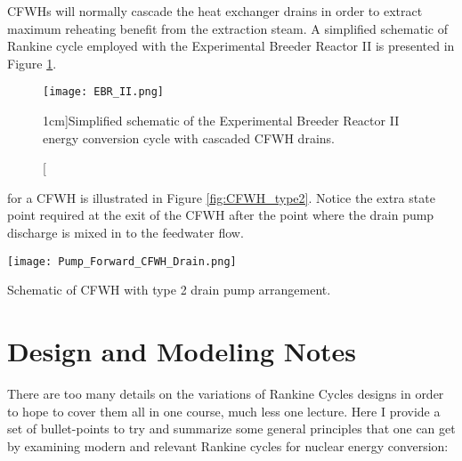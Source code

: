  CFWHs will normally cascade the heat exchanger drains in order to extract maximum reheating benefit from the extraction steam.  A simplified schematic of Rankine cycle employed with the Experimental Breeder Reactor II is presented in Figure \ref{fig:EBRII}.\cite{koch2008experimental}
\begin{figure}
\texttt{[image: EBR\_II.png]}
\caption[][1cm]{Simplified schematic of the Experimental Breeder Reactor II energy conversion cycle with cascaded CFWH drains.}
\label{fig:EBRII}
\end{figure}


 for a CFWH is illustrated in Figure \ref{fig:CFWH_type2}.  Notice the extra state point required at the exit of the CFWH after the point where the drain pump discharge is mixed in to the feedwater flow.  
\begin{marginfigure}
\texttt{[image: Pump\_Forward\_CFWH\_Drain.png]}
\caption{Schematic of CFWH with type 2 drain pump arrangement.}
\label{fig:CFWH_type2}
\end{marginfigure}




\section{Design and Modeling Notes}
There are too many details on the variations of Rankine Cycles designs in order to hope to cover them all in one course, much less one lecture.  Here I provide a set of bullet-points to try and summarize some general principles that one can get by examining modern and relevant Rankine cycles for nuclear energy conversion:

